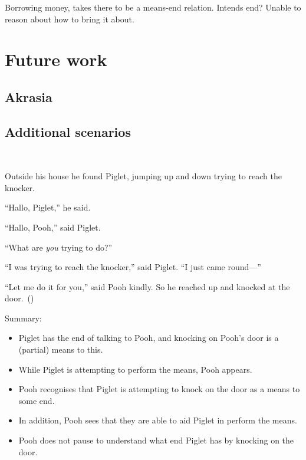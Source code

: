 \documentclass[10pt]{article}
\begin{document}
Borrowing money, takes there to be a means-end relation.
Intends end?
Unable to reason about how to bring it about.

\newpage

\section{Future work}
\label{sec:future-work}

\subsection{Akrasia}
\label{sec:akrasia}

\subsection{Additional scenarios}
\label{sec:additional-scenarios}


\begin{scenario}\mbox{ }

  Outside his house he found Piglet, jumping up and down trying to reach the knocker.

  ``Hallo, Piglet,'' he said.

  ``Hallo, Pooh,'' said Piglet.

  ``What are \emph{you} trying to do?''

  ``I was trying to reach the knocker,'' said Piglet. ``I just came round---''

  ``Let me do it for you,'' said Pooh kindly. So he reached up and knocked at the door.\linebreak \mbox{ }\hfill\mbox{(\cite[77--78]{Milne:2009aa})}
\end{scenario}

Summary:
\begin{itemize}
\item Piglet has the end of talking to Pooh, and knocking on Pooh's door is a (partial) means to this.
\item While Piglet is attempting to perform the means, Pooh appears.
\item Pooh recognises that Piglet is attempting to knock on the door as a means to some end.
\item In addition, Pooh sees that they are able to aid Piglet in perform the means.
\item Pooh does not pause to understand what end Piglet has by knocking on the door.
\end{itemize}
\end{document}
